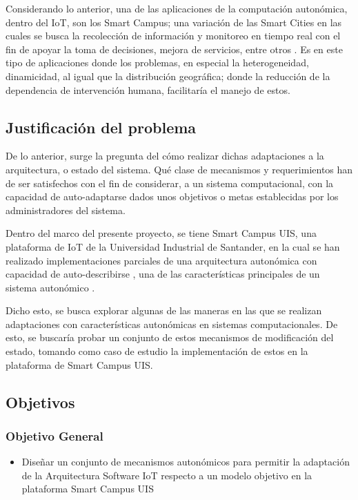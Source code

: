 \documentclass[12pt]{article}
\begin{document}
    Considerando lo anterior, una de las aplicaciones de la computación autonómica, dentro del IoT, son los Smart Campus; una variación de las Smart Cities en las cuales se busca la recolección de información y monitoreo en tiempo real con el fin de apoyar la toma de decisiones, mejora de servicios, entre otros \cite{MinAllah2020}. Es en este tipo de aplicaciones donde los problemas, en especial la heterogeneidad, dinamicidad, al igual que la distribución geográfica; donde la reducción de la dependencia de intervención humana, facilitaría el manejo de estos. 

    \subsection{Justificación del problema} 

    De lo anterior, surge la pregunta del cómo realizar dichas adaptaciones a la arquitectura, o estado del sistema. Qué clase de mecanismos y requerimientos han de ser satisfechos con el fin de considerar, a un sistema computacional, con la capacidad de auto-adaptarse dados unos objetivos o metas establecidas por los administradores del sistema.

    Dentro del marco del presente proyecto, se tiene Smart Campus UIS, una plataforma de IoT de la Universidad Industrial de Santander, en la cual se han realizado implementaciones parciales de una arquitectura autonómica con capacidad de auto-describirse \cite{msc_henry_2022}, una de las características principales de un sistema autonómico \cite{horn_2001}. 
    
    Dicho esto, se busca explorar algunas de las maneras en las que se realizan adaptaciones con características autonómicas en sistemas computacionales. De esto, se buscaría probar un conjunto de estos mecanismos de modificación del estado, tomando como caso de estudio la implementación de estos en la plataforma de Smart Campus UIS.

    \subsection{Objetivos}
    \subsubsection{Objetivo General}
    \begin{itemize}

        \item Diseñar un conjunto de mecanismos autonómicos para permitir la adaptación de la Arquitectura Software IoT respecto a un modelo objetivo en la plataforma Smart Campus UIS

    \end{itemize}
\end{document}
